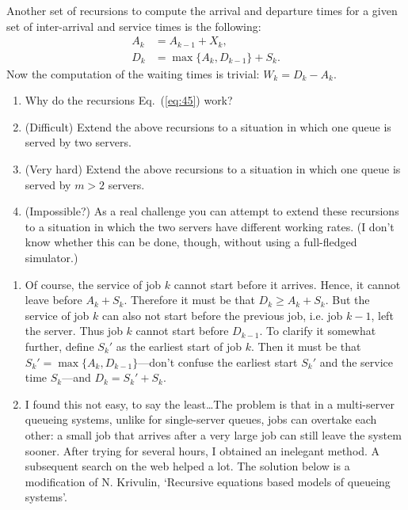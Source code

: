 \begin{question}

  Another set of recursions to compute the arrival and departure times
  for a given set of inter-arrival and service times is the following:
\begin{equation}
  \label{eq:45}
  \begin{split}
    A_k &= A_{k-1} + X_k, \\
    D_k &= \max\{A_k, D_{k-1}\} + S_k.
  \end{split}
\end{equation}
Now the computation of the waiting times is trivial:
$W_k = D_k - A_k$.
  \begin{enumerate}
  \item Why do the recursions Eq.~(\ref{eq:45}) work? 
  \item  (Difficult) Extend the above recursions to a situation in which one queue is
  served by two servers.  
\item (Very hard) Extend the above recursions to a situation in which
  one queue is served by $m>2$ servers.
\item (Impossible?) As a real challenge you can attempt to extend these recursions to
  a situation in which the two servers have different working
  rates. (I don't know whether this can be done, though, without using
  a full-fledged simulator.)
  \end{enumerate}
  \begin{solution}
    \begin{enumerate}
    \item Of course, the service of job $k$ cannot start before it
      arrives. Hence, it cannot leave before $A_k + S_k$. Therefore it
      must be that $D_k \geq A_k +S_k$. But the service of job $k$ can
      also not start before the previous job, i.e. job $k-1$, left the
      server. Thus job $k$ cannot start before $D_{k-1}$. To clarify
      it somewhat further, define $S_k'$ as the earliest start of job
      $k$. Then it must be that $S_k' = \max\{A_k, D_{k-1}\}$---don't
      confuse the earliest start $S_k'$ and the service time
      $S_k$---and $D_k = S_k' + S_k$.
    \item I found this not easy, to say the least\ldots The problem is
      that in a multi-server queueing systems, unlike for
      single-server queues, jobs can overtake each other: a small job
      that arrives after a very large job can still leave the system
      sooner. After trying for several hours, I obtained an inelegant
      method. A subsequent search on the web helped a lot. The
      solution below is a modification of N. Krivulin, `Recursive
      equations based models of queueing systems'. 


\end{enumerate}
\end{solution}
\end{question}
